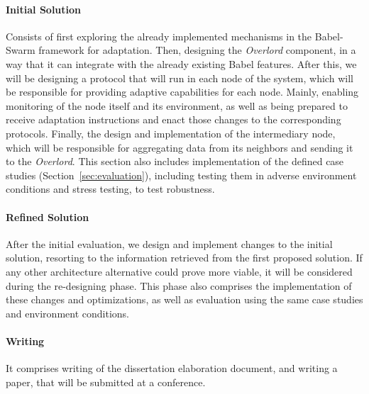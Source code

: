 \paragraph{Initial Solution} Consists of first exploring the already implemented mechanisms in the Babel-Swarm framework for adaptation. Then, designing the \textit{Overlord} component, in a way that it can integrate with the already existing Babel features. After this, we will be designing a protocol that will run in each node of the system, which will be responsible for providing adaptive capabilities for each node. Mainly, enabling monitoring of the node itself and its environment, as well as being prepared to receive adaptation instructions and enact those changes to the corresponding protocols. Finally, the design and implementation of the intermediary node, which will be responsible for aggregating data from its neighbors and sending it to the \textit{Overlord}. This section also includes implementation of the defined case studies (Section~\ref{sec:evaluation}), including testing them in adverse environment conditions and stress testing, to test robustness. %
\paragraph{Refined Solution} After the initial evaluation, we design and implement changes to the initial solution, resorting to the information retrieved from the first proposed solution. If any other architecture alternative could prove more viable, it will be considered during the re-designing phase. This phase also comprises the implementation of these changes and optimizations, as well as evaluation using the same case studies and environment conditions. %
\paragraph{Writing} It comprises writing of the dissertation elaboration document, and writing a paper, that will be submitted at a conference.